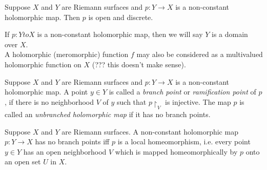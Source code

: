 \begin{thm}

Suppose $X$ and $Y$ are Riemann surfaces and $p:Y \to X$ is a non-constant holomorphic map. Then $p$ is open and discrete.

\end{thm}

If $p:Y to X$ is a non-constant holomorphic map, then we will say $Y$ is a domain over $X$.\\
\indent A holomorphic (meromorphic) function $f$ may also be considered as a multivalued holomorphic function on $X$ (??? this doesn't make sense).

\begin{defn}

Suppose $X$ and $Y$ are Riemann surfaces and $p: Y \to X$ is a non-constant holomorphic map. A point $y \in Y$ is called a \textit{branch point} or \textit{ramification point} of $p$, if there is no neighborhood $V$ of $y$ such that $p \restriction_V$ is injective. The map $p$ is called an \textit{unbranched holomorphic map} if it has no branch points.
\end{defn}

\begin{thm}

Suppose $X$ and $Y$ are Riemann surfaces. A non-constant holomorphic map $p: Y \to X$ has no branch points iff $p$ is a local homeomorphism, i.e. every point $y \in Y$ has an open neighborhood $V$ which is mapped homeomorphically by $p$ onto an open set $U$ in $X$.

\end{thm}





















